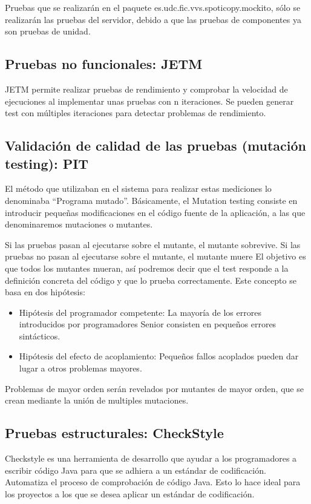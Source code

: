 \documentclass[DIV=calc,paper=a4,fontsize=11pt,onecolumn]{scrartcl} %
\begin{document}
	Pruebas que se realizarán en el paquete es.udc.fic.vvs.spoticopy.mockito, sólo se realizarán las pruebas del servidor, debido a que las pruebas de componentes ya son pruebas de unidad.
	\subsection{Pruebas no funcionales: JETM}
	JETM permite realizar pruebas de rendimiento y comprobar la velocidad de ejecuciones al implementar unas pruebas con n iteraciones. Se pueden generar test con múltiples iteraciones para detectar problemas de rendimiento.
	\subsection{Validación de calidad de las pruebas (mutación testing): PIT}
	
	El  método que utilizaban en el sistema para realizar estas mediciones lo denominaba “Programa mutado”.
	Básicamente, el Mutation testing consiste en introducir pequeñas modificaciones en el código fuente de la aplicación, a las que denominaremos mutaciones o mutantes.
	
	Si las pruebas pasan al ejecutarse sobre el mutante, el mutante sobrevive.
	Si las pruebas no pasan al ejecutarse sobre el mutante, el mutante muere
	El objetivo es que todos los mutantes mueran, así podremos decir que el test responde a la definición concreta del código y que lo prueba correctamente.
	Este concepto se basa en dos hipótesis:
	\begin{itemize}
		\item Hipótesis del programador competente: La mayoría de los errores introducidos por programadores Senior consisten en pequeños errores sintácticos.
		\item Hipótesis del efecto de acoplamiento: Pequeños fallos acoplados pueden dar lugar a otros problemas mayores.
	\end{itemize}
	Problemas de mayor orden serán revelados por mutantes de mayor orden, que se crean mediante la unión de multiples mutaciones.
	
	\subsection{Pruebas estructurales: CheckStyle}
	
	Checkstyle es una herramienta de desarrollo que ayudar a los programadores a escribir código Java para que se adhiera a un estándar de codificación. Automatiza el proceso de comprobación de código Java. Esto lo hace ideal para los proyectos a los que se desea aplicar un estándar de codificación.
	
\end{document}
